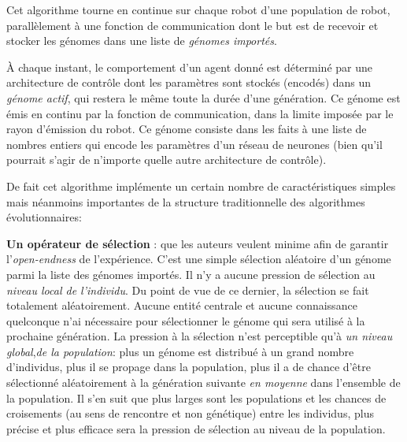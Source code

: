 Cet algorithme tourne en continue sur chaque robot d'une population de robot, parallèlement à une fonction de communication dont le but est de recevoir et stocker les génomes dans une liste de \emph{génomes importés}.

À chaque instant, le comportement d'un agent donné est déterminé par une architecture de contrôle dont les paramètres sont stockés (encodés) dans un \emph{génome actif}, qui restera le même toute la durée d'une génération. Ce génome est émis en continu par la fonction de communication, dans la limite imposée par le rayon d'émission du robot. Ce génome consiste dans les faits à une liste de nombres entiers qui encode les paramètres d'un réseau de neurones (bien qu'il pourrait s'agir de n'importe quelle autre architecture de contrôle).

De fait cet algorithme implémente un certain nombre de caractéristiques simples mais néanmoins importantes de la structure traditionnelle des algorithmes évolutionnaires: 

\textbf{Un opérateur de sélection }: que les auteurs veulent minime afin de garantir l'\emph{open-endness} de l'expérience. C'est une simple sélection aléatoire d'un génome parmi la liste des génomes importés. Il n'y a aucune pression de sélection au \emph{niveau local de l'individu}. Du point de vue de ce dernier, la sélection se fait totalement aléatoirement. Aucune entité centrale et aucune connaissance quelconque n'ai nécessaire pour sélectionner le génome qui sera utilisé à la prochaine génération. La pression à la sélection n'est perceptible qu'à \emph{un niveau global},\emph{de la population}: plus un génome est distribué à un grand nombre d'individus, plus il se propage dans la population, plus il a de chance d'être sélectionné aléatoirement à la génération suivante \emph{en moyenne} dans l'ensemble de la population. Il s'en suit que plus larges sont les populations et les chances de croisements (au sens de rencontre et non génétique) entre les individus, plus précise et plus efficace sera la pression de sélection au niveau de la population.

